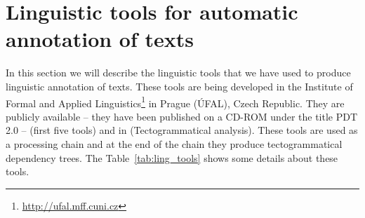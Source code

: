 

\section{Linguistic tools for automatic annotation of texts} \label{sec:ling_tools}


In this section we will describe the linguistic tools that we have used to produce linguistic annotation of texts. These tools are being developed in the Institute of Formal and Applied Linguistics\footnote{\url{http://ufal.mff.cuni.cz}} in Prague (ÚFAL), Czech Republic. They are publicly available -- they have been published on a CD-ROM under the title PDT 2.0 -- \citealt{biblio:PDT20_CD} (first five tools) and in \citealt{biblio:KlTransformationBasedTectogrammatical2006} (Tectogrammatical analysis). These tools are used as a processing chain and at the end of the chain they produce tectogrammatical \citep{biblio:MiBeAnnotationtectogrammatical2006} dependency trees. The Table~\ref{tab:ling_tools} shows some details about these tools.



